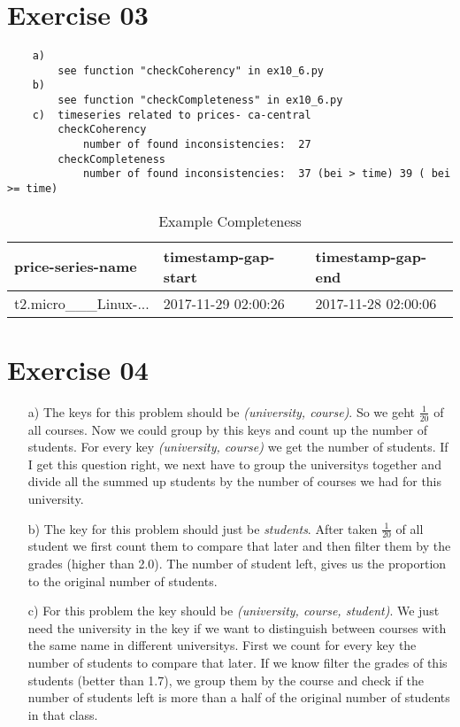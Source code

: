 \documentclass[11pt,a4paper]{scrartcl}
\begin{document}
\section*{Exercise 03}
\begin{verbatim}
	a) 
		see function "checkCoherency" in ex10_6.py
	b) 
		see function "checkCompleteness" in ex10_6.py
	c)	timeseries related to prices- ca-central
		checkCoherency
			number of found inconsistencies:  27
		checkCompleteness
			number of found inconsistencies:  37 (bei > time) 39 ( bei >= time)
\end{verbatim}

\begin{table}[]
\centering
\caption{Example Completeness}
\label{my-label}
\begin{tabular}{lll}
\hline
\multicolumn{1}{|l|}{price-series-name} & \multicolumn{1}{l|}{timestamp-gap-start} & \multicolumn{1}{l|}{timestamp-gap-end} \\ \hline
t2.micro\_\_\_Linux-...                 & 2017-11-29 02:00:26                      & 2017-11-28 02:00:06                   
\end{tabular}
\end{table}

\section*{Exercise 04}
	
\begin{itemize}
\item[a)] The keys for this problem should be \textit{(university, course)}. So we geht $\frac{1}{20}$ of all courses. Now we could group by this keys and count up the number of students. For every key \textit{(university, course)} we get the number of students. If I get this question right, we next have to group the universitys together and divide all the summed up students by the number of courses we had for this university.
\item[b)] The key for this problem should just be \textit{students}. After taken $\frac{1}{20}$ of all student we first count them to compare that later and then filter them by the grades (higher than 2.0). The number of student left, gives us the proportion to the original number of students.
\item[c)] For this problem the key should be \textit{(university, course, student)}. We just need the university in the key if we want to distinguish between courses with the same name in different universitys. First we count for every key the number of students to compare that later. If we know filter the grades of this students (better than 1.7), we group them by the course and check if the number of students left is more than a half of the original number of students in that class.
\end{itemize}
\end{document}
